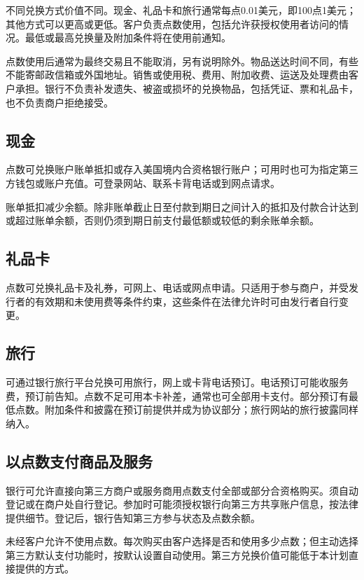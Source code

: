 \documentclass[UTF8,fontset=none,11pt,a4paper]{ctexart}
\begin{document}
不同兑换方式价值不同。现金、礼品卡和旅行通常每点0.01美元，即100点1美元；其他方式可以更高或更低。客户负责点数使用，包括允许获授权使用者访问的情况。最低或最高兑换量及附加条件将在使\allowbreak\mbox{用前通知。}


点数使用后通常为最终交易且不能取消，另有说明除外。物品送达时间不同，有些不能寄邮政信箱或外国地址。销售或使用税、费用、附加收费、运送及处理费由客户承担。银行不负责补发遗失、被盗或损坏的兑换物品，包括凭证、票和礼品卡，也不负责商户\allowbreak\mbox{拒绝接受。}


\subsection*{现金}
点数可兑换账户账单抵扣或存入美国境内合资格银行账户；可用时也可为指定第三方钱包或账户充值。可登录网站、联系卡背电话或到\allowbreak\mbox{网点请求。}


账单抵扣减少余额。除非账单截止日至付款到期日之间计入的抵扣及付款合计达到或超过账单余额，否则仍须到期日前支付最低额或较低的剩余\allowbreak\mbox{账单余额。}


\subsection*{礼品卡}
点数可兑换礼品卡及礼券，可网上、电话或网点申请。只适用于参与商户，并受发行者的有效期和未使用费等条件约束，这些条件在法律允许时可由发行者\allowbreak\mbox{自行变更。}


\subsection*{旅行}
可通过银行旅行平台兑换可用旅行，网上或卡背电话预订。电话预订可能收服务费，预订前告知。点数不足可用本卡补差，通常也可全部用卡支付。部分预订有最低点数。附加条件和披露在预订前提供并成为协议部分；旅行网站的旅行披露\allowbreak\mbox{同样纳入。}


\subsection*{以点数支付商品及服务}
银行可允许直接向第三方商户或服务商用点数支付全部或部分合资格购买。须自动登记或在商户处自行登记。参加时可能须授权银行向第三方共享账户信息，按法律提供细节。登记后，银行告知第三方参与状态及\allowbreak\mbox{点数余额。}


未经客户允许不使用点数。每次购买由客户选择是否和使用多少点数；但主动选择第三方默认支付功能时，按默认设置自动使用。第三方兑换价值可能低于本计划直接提\allowbreak\mbox{供的方式。}
\end{document}
